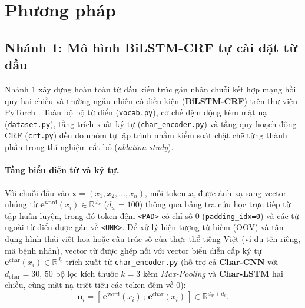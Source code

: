 \section{Phương pháp}
\label{sec:method}

\subsection{Nhánh 1: Mô hình BiLSTM-CRF tự cài đặt từ đầu}
\label{sec:method-bilstm}

Nhánh 1 xây dựng hoàn toàn từ đầu kiến trúc gán nhãn chuỗi kết hợp mạng hồi quy hai chiều và trường ngẫu nhiên có điều kiện (\textbf{BiLSTM-CRF}) trên thư viện PyTorch \citep{lample-etal-2016-neural, ma-hovy-2016-end}. Toàn bộ bộ từ điển (\texttt{vocab.py}), cơ chế đệm động kèm mặt nạ (\texttt{dataset.py}), tầng trích xuất ký tự (\texttt{char\_encoder.py}) và tầng quy hoạch động CRF (\texttt{crf.py}) đều do nhóm tự lập trình nhằm kiểm soát chặt chẽ từng thành phần trong thí nghiệm cắt bỏ (\textit{ablation study}).

\paragraph{Tầng biểu diễn từ và ký tự.}
Với chuỗi đầu vào $\mathbf{x} = (x_1, x_2, \dots, x_n)$, mỗi token $x_i$ được ánh xạ sang vector nhúng từ $\mathbf{e}^{\text{word}}(x_i) \in \mathbb{R}^{d_w}$ ($d_w = 100$) thông qua bảng tra cứu học trực tiếp từ tập huấn luyện, trong đó token đệm \texttt{<PAD>} có chỉ số $0$ (\texttt{padding\_idx=0}) và các từ ngoài từ điển được gán về \texttt{<UNK>}. Để xử lý hiện tượng từ hiếm (OOV) và tận dụng hình thái viết hoa hoặc cấu trúc số của thực thể tiếng Việt (ví dụ tên riêng, mã bệnh nhân), vector từ được ghép nối với vector biểu diễn cấp ký tự $\mathbf{e}^{\text{char}}(x_i) \in \mathbb{R}^{d_c}$ trích xuất từ \texttt{char\_encoder.py} (hỗ trợ cả \textbf{Char-CNN} với $d_{\text{char}}=30$, $50$ bộ lọc kích thước $k=3$ kèm \textit{Max-Pooling} và \textbf{Char-LSTM} hai chiều, cùng mặt nạ triệt tiêu các token đệm về $0$):
\begin{equation}
    \mathbf{u}_i = \left[\,\mathbf{e}^{\text{word}}(x_i) \,;\, \mathbf{e}^{\text{char}}(x_i)\,\right] \in \mathbb{R}^{d_w + d_c}.
\end{equation}

